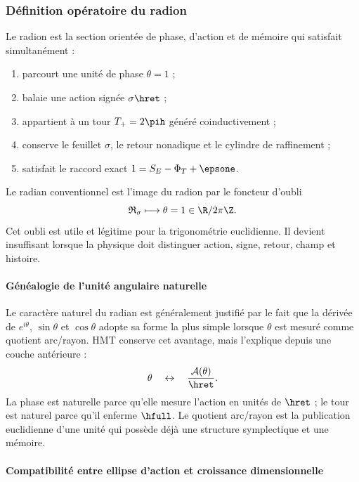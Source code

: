 \subsubsection{Définition opératoire du radion}

\begin{definition}
Le radion est la section orientée de phase, d'action et de mémoire qui satisfait
simultanément :
\begin{enumerate}
\item parcourt une unité de phase \(\theta=1\) ;
\item balaie une action signée \(\sigma\hret\) ;
\item appartient à un tour \(T_+=2\pih\) généré coinductivement ;
\item conserve le feuillet \(\sigma\), le retour nonadique et le cylindre de
raffinement ;
\item satisfait le raccord exact
\(1=S_E-\Phi_T+\epsone\).
\end{enumerate}
\end{definition}

Le radian conventionnel est l'image du radion par le foncteur d'oubli
\[
\mathfrak R_\sigma
\longmapsto
\theta=1\in\R/2\pi\Z.
\]
Cet oubli est utile et légitime pour la trigonométrie euclidienne. Il devient
insuffisant lorsque la physique doit distinguer action, signe, retour,
champ et histoire.

\paragraph{Généalogie de l'unité angulaire naturelle}

Le caractère naturel du radian est généralement justifié par le fait que la dérivée de
\(e^{i\theta}\), \(\sin\theta\) et \(\cos\theta\) adopte sa forme la plus simple
lorsque \(\theta\) est mesuré comme quotient arc/rayon. HMT conserve cet avantage,
mais l'explique depuis une couche antérieure :
\[
\theta\quad\leftrightarrow\quad
\frac{\mathcal A(\theta)}{\hret}.
\]
La phase est naturelle parce qu'elle mesure l'action en unités de \(\hret\) ; le tour est
naturel parce qu'il enferme \(\hfull\). Le quotient arc/rayon est la publication
euclidienne d'une unité qui possède déjà une structure symplectique et une mémoire.

\paragraph{Compatibilité entre ellipse d'action et croissance dimensionnelle}

